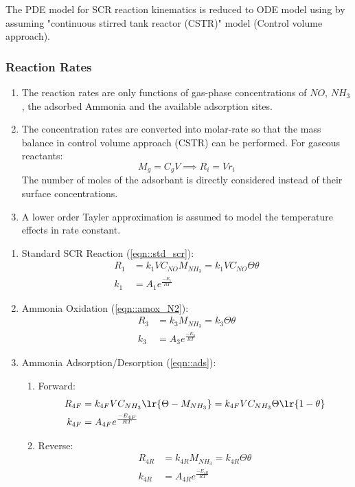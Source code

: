 The PDE model for SCR reaction kinematics \cite{nova2014urea} is reduced to ODE model \cite{devarakonda2008adequacy} using by assuming "continuous stirred tank reactor (CSTR)" model (Control volume approach).


\subsubsection{Reaction Rates}
\begin{enumerate}
\item The reaction rates are only functions of gas-phase concentrations of $NO$,
$NH_3$, the adsorbed Ammonia and the available adsorption sites.

\item The concentration rates are converted into molar-rate so that the
mass balance in control volume approach (CSTR) can be performed. For gaseous reactants:
$$ M_g = C_g V \implies R_i = V r_i $$
The number of moles of the adsorbant is directly considered instead of their
surface concentrations.

\item A lower order Tayler approximation is assumed to model the temperature
effects in rate constant.
\end{enumerate}

\begin{enumerate}
\item Standard SCR Reaction (\ref{eqn::std_scr}):
\begin{align*}
    R_1 &= k_1 V C_{NO} M_{NH_3} = k_1V C_{NO} \Theta \theta\\
    k_1 &= A_1 e^{\frac{-E_1}{RT}}
\end{align*}

\item Ammonia Oxidation (\ref{eqn::amox_N2}):
\begin{align*}
    R_3 &= k_3 M_{NH_3} = k_3 \Theta \theta\\
    k_3 &= A_3 e^{\frac{-E_3}{RT}}
\end{align*}

\item Ammonia Adsorption/Desorption (\ref{eqn::ads}):
\begin{enumerate}
\item Forward:
\begin{align*}
    R_{4F} &= k_{4F} V C_{NH_3} \lr{\Theta - M_{NH_3}}
            = k_{4F} V C_{NH_3} \Theta \lr{1 - \theta}\\
    k_{4F} &= A_{4F} e^{\frac{-E_{4F}}{RT}}
\end{align*}

\item Reverse:
\begin{align*}
    R_{4R} &= k_{4R} M_{NH_3}
            = k_{4R} \Theta \theta \\
    k_{4R} &= A_{4R} e^{\frac{-E_{4R}}{RT}}
\end{align*}
\end{enumerate}
\end{enumerate}

